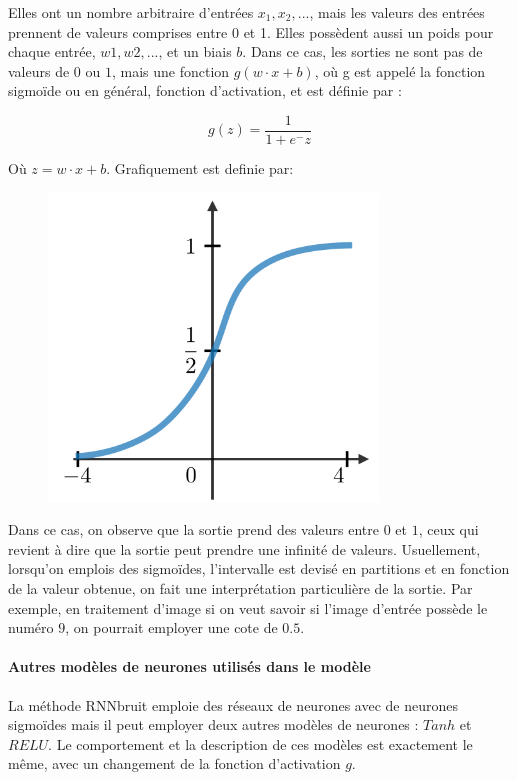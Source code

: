 \documentclass[conference,onecolumn]{IEEEtran}
\begin{document}
Elles ont un nombre arbitraire d’entrées $x_1, x_2, ...$, mais les valeurs des entrées prennent de valeurs comprises entre 0 et 1. Elles possèdent aussi un poids pour chaque entrée, $w1, w2, ...$, et un biais $b$. Dans ce cas, les sorties ne sont pas de valeurs de $0$ ou $1$, mais une fonction $g(w\cdot x+b)$, où g est appelé la fonction sigmoïde ou en général, fonction d’activation, et est définie par : 

\begin{equation}
    g(z)=\dfrac{1}{1+e^-z}
\end{equation}

Où $z=w\cdot x+b$. Grafiquement est definie par:

 \begin{figure}[H]
 \centering
    \includegraphics[scale=0.5]{img10.png}
\end{figure}

Dans ce cas, on observe que la sortie prend des valeurs entre $0$ et $1$, ceux qui revient à dire que la sortie peut prendre une infinité de valeurs. Usuellement, lorsqu’on emplois des sigmoïdes, l’intervalle est devisé en partitions et en fonction de la valeur obtenue, on fait une interprétation particulière de la sortie. Par exemple, en traitement d’image si on veut savoir si l’image d’entrée possède le numéro $9$, on pourrait employer une cote de $0.5$.  


\paragraph{Autres modèles de neurones utilisés dans le modèle}
La méthode RNNbruit emploie des réseaux de neurones avec de neurones sigmoïdes mais il peut employer deux autres modèles de neurones : $Tanh$ et $RELU$. Le comportement et la description de ces modèles est exactement le même, avec un changement de la fonction d’activation $g$. 
\end{document}
